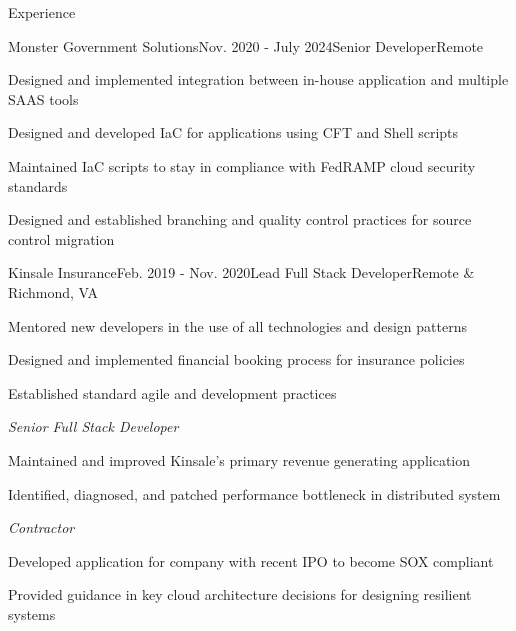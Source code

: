 \documentclass{resume} %
\begin{document}

\begin{rSection}{Experience}

	\begin{rSubsection}{Monster Government Solutions}{Nov. 2020 - July 2024}{\vspace{-0.5em}Senior Developer}{Remote}
		\item Designed and implemented integration between in-house application and multiple SAAS tools
		\item Designed and developed IaC for applications using CFT and Shell scripts
		\item Maintained IaC scripts to stay in compliance with FedRAMP cloud security standards
		\item Designed and established branching and quality control practices for source control migration
	\end{rSubsection}

	\begin{rSubsection}{Kinsale Insurance}{Feb. 2019 - Nov. 2020}{\vspace{-0.5em}Lead Full Stack Developer}{Remote \& Richmond, VA}
			\item Mentored new developers in the use of all technologies and design patterns
			\item Designed and implemented financial booking process for insurance policies
			\item Established standard agile and development practices

	    \vspace{-0.5em}\setlength{\itemindent}{.0in}\emph{Senior Full Stack Developer}
	    	\item Maintained and improved Kinsale's primary revenue generating application
			\item Identified, diagnosed, and patched performance bottleneck in distributed system

		\vspace{-0.5em}\setlength{\itemindent}{.0in}\emph{Contractor}
			\item Developed application for company with recent IPO to become SOX compliant
			\item Provided guidance in key cloud architecture decisions for designing resilient systems



\end{rSubsection}
\end{rSection}
\end{document}
